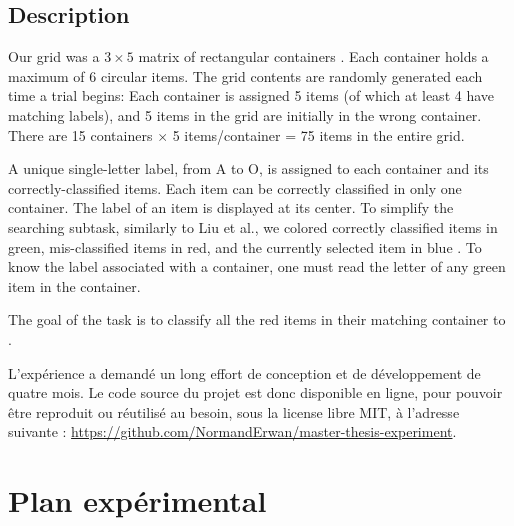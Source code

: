\subsection{Description}
\label{subsec:experiment_task_description}


Our grid was a $3 \times 5$ matrix of rectangular containers . Each container holds a maximum of 6 circular items. The grid contents are randomly generated each time a trial begins: Each container is assigned 5 items (of which at least 4 have matching labels), and 5 items in the grid are initially in the wrong container. There are 15 containers $\times$ 5 items/container = 75 items in the entire grid.

A unique single-letter label, from A to O, is assigned to each container and its correctly-classified items. Each item can be correctly classified in only one container. The label of an item is displayed at its center. To simplify the searching subtask, similarly to Liu et al., we colored correctly classified items in green, mis-classified items in red, and the currently selected item in blue . To know the label associated with a container, one must read the letter of any green item in the container.

The goal of the task is to classify all the red items in their matching container to  \citep{Liu2014}.

L'expérience a demandé un long effort de conception et de développement de quatre mois. Le code source du projet est donc disponible en ligne, pour pouvoir être reproduit ou réutilisé au besoin, sous la license libre MIT, à l'adresse suivante : \url{https://github.com/NormandErwan/master-thesis-experiment}.


\section{Plan expérimental}
\label{sec:experiment_design}


